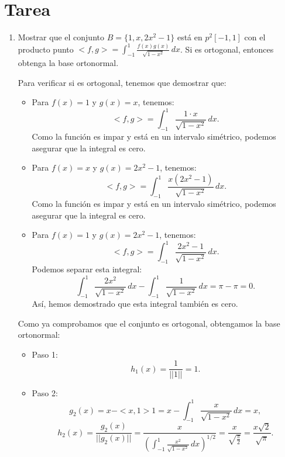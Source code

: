 \documentclass{report}
\begin{document}

    \section*{Tarea}
    \begin{enumerate}
        \item Mostrar que el conjunto $B=\{1,x,2x^2-1\}$ está en $p^2[-1,1]$ con el producto punto $<f,g>=\int_{-1}^1\frac{f(x)g(x)}{\sqrt{1-x^2}}\, dx$. Si es ortogonal, entonces obtenga la base ortonormal.
        
            Para verificar si es ortogonal, tenemos que demostrar que:
        
            \begin{itemize}
                \item Para $f(x)=1$ y $g(x)=x$, tenemos:
                $$<f,g>=\int_{-1}^1\frac{1 \cdot x}{\sqrt{1-x^2}}\, dx.$$ 
                Como la función es impar y está en un intervalo simétrico, podemos asegurar que la integral es cero.
        
                \item Para $f(x)=x$ y $g(x)=2x^2-1$, tenemos:
                $$<f,g>=\int_{-1}^1\frac{x(2x^2-1)}{\sqrt{1-x^2}}\, dx.$$ 
                Como la función es impar y está en un intervalo simétrico, podemos asegurar que la integral es cero.
        
                \item Para $f(x)=1$ y $g(x)=2x^2-1$, tenemos:
                $$<f,g>=\int_{-1}^1\frac{2x^2-1}{\sqrt{1-x^2}}\, dx.$$ 
                Podemos separar esta integral:
                $$\int_{-1}^1\frac{2x^2}{\sqrt{1-x^2}}\, dx - \int_{-1}^1\frac{1}{\sqrt{1-x^2}}\, dx = \pi - \pi = 0.$$ 
                Así, hemos demostrado que esta integral también es cero.
            \end{itemize}
               
            Como ya comprobamos que el conjunto es ortogonal, obtengamos la base ortonormal:
        
            \begin{itemize}
                \item Paso 1: 
                $$h_1(x)=\frac{1}{||1||}=1.$$
        
                \item Paso 2: 
                $$g_2(x)=x-<x,1>1=x-\int_{-1}^1\frac{x}{\sqrt{1-x^2}}\, dx = x,$$ 
                $$h_2(x)=\frac{g_2(x)}{||g_2(x)||}=\frac{x}{\left(\int_{-1}^1\frac{x^2}{\sqrt{1-x^2}}\, dx\right)^{1/2}}=\frac{x}{\sqrt{\frac{\pi}{2}}}=\frac{x\sqrt{2}}{\sqrt{\pi}}.$$
        

\end{itemize}
\end{enumerate}
\end{document}
